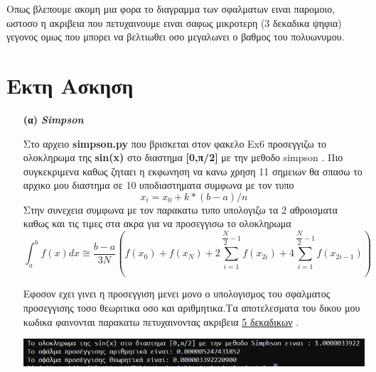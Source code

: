 \documentclass[a4paper,11pt]{article}
\begin{document}
\begin{enumerate}
\begin{center}
		\end{center}
		\begin{center}
			Οπως βλεπουμε ακομη μια φορα το διαγραμμα των σφαλματων ειναι παρομοιο, ωστοσο η ακριβεια που πετυχαινουμε ειναι σαφως μικροτερη (3 δεκαδικα ψηφια) γεγονος ομως που μπορει να βελτιωθει οσο μεγαλωνει ο βαθμος του πολυωνυμου. 
		\end{center}
	\end{enumerate}
	\section{Εκτη Ασκηση}
	\begin{enumerate}
		\item[\textbf{(α)}] \emph {\textbf{Simpson}}
		\begin{center}
			Στο αρχειο \textbf{simpson.py} που βρισκεται στον φακελο Ex6 προσεγγιζω το ολοκληρωμα της \textbf{sin(x)} στο διαστημα \textbf{[0,π/2]} με την μεθοδο simpson . Πιο συγκεκριμενα καθως ζηταει η εκφωνηση να κανω χρηση 11 σημειων θα σπασω το αρχικο μου διαστημα σε 10 υποδιαστηματα συμφωνα με τον τυπο $$x_i = x_0+k*(b-a)/n$$ Στην συνεχεια συμφωνα με τον παρακατω τυπο υπολογιζω τα 2 αθροισματα καθως και τις τιμες στα ακρα για να προσεγγισω το ολοκληρωμα $$\int_{a}^{b}f(x)dx\cong\dfrac{b-a}{3N}(f(x_0) + f(x_N) + 2\sum_{i=1}^{\dfrac{N}{2}-1}f(x_{2i}) + 4\sum_{i=1}^{\dfrac{N}{2}-1}f(x_{2i-1}))$$
		\end{center}
		\begin{center}
			Εφοσον εχει γινει η προσεγγιση μενει μονο ο υπολογισμος του σφαλματος προσεγγισης τοσο θεωριτικα οσο και αριθμητικα.Τα αποτελεσματα του δικου μου κωδικα φαινονται παρακατω πετυχαινοντας ακριβεια \underline{5 δεκαδικων} .
		\end{center}
		\begin{center}
			\emph{\includegraphics[scale=0.55]{simpson.png}}
		\end{center}
		

\end{enumerate}
\end{document}
